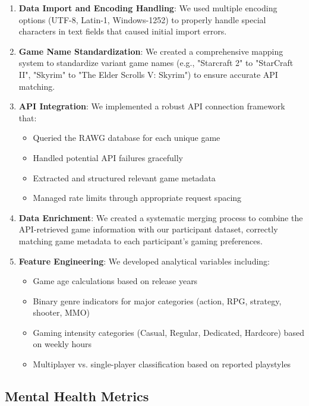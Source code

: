 \documentclass[12pt]{article}
\begin{document}
\begin{enumerate}
    \item \textbf{Data Import and Encoding Handling}: We used multiple encoding options (UTF-8, Latin-1, Windows-1252) to properly handle special characters in text fields that caused initial import errors.

    \item \textbf{Game Name Standardization}: We created a comprehensive mapping system to standardize variant game names (e.g., "Starcraft 2" to "StarCraft II", "Skyrim" to "The Elder Scrolls V: Skyrim") to ensure accurate API matching.

    \item \textbf{API Integration}: We implemented a robust API connection framework that:
    \begin{itemize}
        \item Queried the RAWG database for each unique game
        \item Handled potential API failures gracefully
        \item Extracted and structured relevant game metadata
        \item Managed rate limits through appropriate request spacing
    \end{itemize}

    \item \textbf{Data Enrichment}: We created a systematic merging process to combine the API-retrieved game information with our participant dataset, correctly matching game metadata to each participant's gaming preferences.

    \item \textbf{Feature Engineering}: We developed analytical variables including:
    \begin{itemize}
        \item Game age calculations based on release years
        \item Binary genre indicators for major categories (action, RPG, strategy, shooter, MMO)
        \item Gaming intensity categories (Casual, Regular, Dedicated, Hardcore) based on weekly hours
        \item Multiplayer vs. single-player classification based on reported playstyles
    \end{itemize}
\end{enumerate}

\subsection{Mental Health Metrics}
\end{document}
